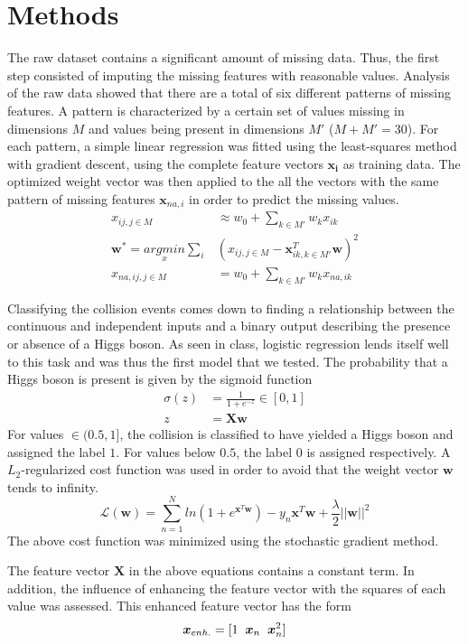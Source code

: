 \documentclass[10pt,conference,compsocconf]{IEEEtran}
\begin{document}
\section*{Methods}
The raw dataset contains a significant amount of missing data. Thus, the first step consisted of imputing the missing features with reasonable values. Analysis of the raw data showed that there are a total of six different patterns of missing features. A pattern is characterized by a certain set of values missing in dimensions $M$ and values being present in dimensions $M'$ ($M+M' = 30$). For each pattern, a simple linear regression was fitted using the least-squares method with gradient descent, using the complete feature vectors $\boldsymbol{x_i}$ as training data. The optimized weight vector was then applied to the all the vectors with the same pattern of missing features $\boldsymbol{x}_{na,i}$ in order to predict the missing values.
\begin{align*}
{x}_{ij, j \in M} &\approx w_0 + \sum_{k \in M'} w_k {x}_{ik}\\
\boldsymbol{w}^* = \underset{x}{argmin}\sum_i & ({x}_{ij, j \in M} - \boldsymbol{x}^T_{ik, k \in M'} \boldsymbol{w})^2\\
{x}_{na,ij, j \in M} &= w_0 + \sum_{k \in M'} w_k {x}_{na,ik}
\end{align*} \par
Classifying the collision events comes down to finding a relationship between the continuous and independent inputs and a binary output describing the presence or absence of a Higgs boson. As seen in class, logistic regression lends itself well to this task and was thus the first model that we tested. 
The probability that a Higgs boson is present is given by the sigmoid function
\begin{align*}
\sigma(z) &= \frac{1}{1+e^{-z}} \in [0,1]\\
z & = \boldsymbol{Xw} 
\end{align*}
For values $\in (0.5,1]$, the collision is classified to have yielded a Higgs boson and assigned the label $1$. For values below $0.5$, the label $0$ is assigned respectively. A $L_2$-regularized cost function was used in order to avoid that the weight vector $\boldsymbol{w}$ tends to infinity.  
\begin{equation}
\mathcal{L}(\boldsymbol{w}) = \sum_{n=1}^N ln(1+e^{\boldsymbol{x}^T\boldsymbol{w}}) - y_n \boldsymbol{x}^T\boldsymbol{w} + \frac{\lambda}{2}||\boldsymbol{w}||^2
\end{equation}
The above cost function was minimized using the stochastic gradient method. \par
The feature vector $\boldsymbol{X}$ in the above equations contains a constant term. In addition, the influence of enhancing the feature vector with the squares of each value was assessed. This enhanced feature vector has the form
\begin{equation}
\boldsymbol{x}_{enh.} = [1 \hspace{2mm} \boldsymbol{x}_n \hspace{2mm} \boldsymbol{x}_n^2]
\end{equation}
\end{document}
